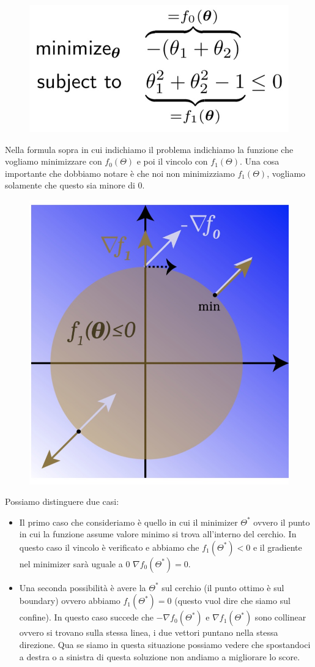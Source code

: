 \documentclass[14pt]{extreport}
\begin{document}
\begin{figure}[H]
	\centering
	\includegraphics[width=0.4\linewidth]{289.jpeg}
\end{figure}

Nella formula sopra in cui indichiamo il problema indichiamo la funzione che vogliamo minimizzare con $f_0(\Theta)$ e poi il vincolo con
$f_1(\Theta)$. Una cosa importante che dobbiamo notare è che noi non minimizziamo $f_1(\Theta)$, vogliamo solamente che questo sia minore di 0.

\begin{figure}[H]
	\centering
	\includegraphics[width=0.5\linewidth]{290.jpeg}
\end{figure}

Possiamo distinguere due casi:
\begin{itemize}
	\item Il primo caso che consideriamo è quello in cui il minimizer $\Theta^*$ ovvero il punto in cui la funzione assume valore minimo si trova
	      all'interno del cerchio. In questo caso il vincolo è verificato e abbiamo che $f_1(\Theta^*) < 0$ e il gradiente nel minimizer sarà uguale a
	      0 $\nabla f_0(\Theta^*) = 0$.
	\item Una seconda possibilità è avere la $\Theta^*$ sul cerchio (il punto ottimo è sul boundary) ovvero abbiamo $f_1(\Theta^*) = 0$ (questo vuol
	      dire che siamo sul confine). In questo caso succede che $-\nabla f_0(\Theta^*)$ e $\nabla f_1(\Theta^*)$ sono collinear ovvero si trovano
	      sulla stessa linea, i due vettori puntano nella stessa direzione. Qua se siamo in questa situazione possiamo vedere che spostandoci a destra
	      o a sinistra di questa soluzione non andiamo a migliorare lo score.
\end{itemize}
\end{document}
